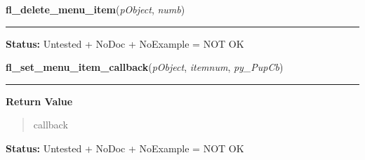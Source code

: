     \vspace{0.5ex}

\hspace{.8\funcindent}\begin{boxedminipage}{\funcwidth}

    \raggedright \textbf{fl\_delete\_menu\_item}(\textit{pObject}, \textit{numb})

    \vspace{-1.5ex}

    \rule{\textwidth}{0.5\fboxrule}
\setlength{\parskip}{2ex}
\setlength{\parskip}{1ex}
\textbf{Status:} Untested + NoDoc + NoExample = NOT OK



    \end{boxedminipage}

    \label{xformslib:library:fl_set_menu_item_callback}

    \vspace{0.5ex}

\hspace{.8\funcindent}\begin{boxedminipage}{\funcwidth}

    \raggedright \textbf{fl\_set\_menu\_item\_callback}(\textit{pObject}, \textit{itemnum}, \textit{py\_PupCb})

    \vspace{-1.5ex}

    \rule{\textwidth}{0.5\fboxrule}
\setlength{\parskip}{2ex}
\setlength{\parskip}{1ex}
      \textbf{Return Value}
    \vspace{-1ex}

      \begin{quote}
      callback

      \end{quote}

\textbf{Status:} Untested + NoDoc + NoExample = NOT OK



    \end{boxedminipage}

    \label{xformslib:library:fl_set_menu_item_shortcut}

    \vspace{0.5ex}

